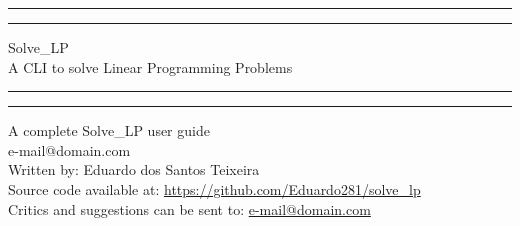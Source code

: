 \documentclass[12pt,hidelinks]{article}
\begin{document}
\begin{titlepage}
	\centering %
	\scshape %
	\vspace*{1.5\baselineskip} %

	\rule{13cm}{1.6pt}\vspace*{-\baselineskip}\vspace*{2pt} %
	\rule{13cm}{0.4pt} %
	
		\vspace{0.75\baselineskip} %
	{	\Huge Solve\_LP\\ 
			\vspace{4mm}
		\LARGE	A CLI to solve Linear Programming Problems \\	}
		\vspace{0.75\baselineskip} %
	\rule{13cm}{0.4pt}\vspace*{-\baselineskip}\vspace{3.2pt} %
	\rule{13cm}{1.6pt} %
	
		\vspace{1.75\baselineskip} %
	{\large A complete Solve\_LP user guide \\
		\vspace*{1.2\baselineskip}
	e-mail@domain.com} \\
	\vfill
Written by: Eduardo dos Santos Teixeira\\
Source code available at: \url{https://github.com/Eduardo281/solve_lp}\\
Critics and suggestions can be sent to: \url{e-mail@domain.com}
\end{titlepage}
\tableofcontents
\newpage
{}
\end{document}
